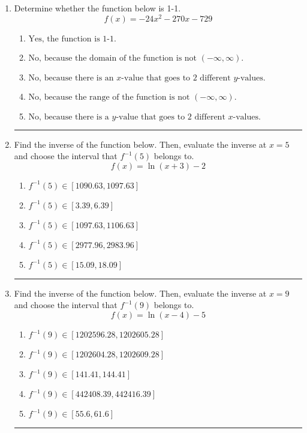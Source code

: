 \documentclass[14pt]{extbook}
\newcommand{\litem}[1]{\item#1\hspace*{-1cm}\rule{\textwidth}{0.4pt}}
\begin{document}
\begin{enumerate}
{\begin{enumerate}[label=\Alph*.]
\end{enumerate} }
\litem{
Determine whether the function below is 1-1.\[ f(x) = -24 x^2 - 270 x - 729 \]\begin{enumerate}[label=\Alph*.]
\item \( \text{Yes, the function is 1-1.} \)
\item \( \text{No, because the domain of the function is not $(-\infty, \infty)$.} \)
\item \( \text{No, because there is an $x$-value that goes to 2 different $y$-values.} \)
\item \( \text{No, because the range of the function is not $(-\infty, \infty)$.} \)
\item \( \text{No, because there is a $y$-value that goes to 2 different $x$-values.} \)

\end{enumerate} }
\litem{
Find the inverse of the function below. Then, evaluate the inverse at $x = 5$ and choose the interval that $f^{-1}(5)$ belongs to.\[ f(x) = \ln{(x+3)}-2 \]\begin{enumerate}[label=\Alph*.]
\item \( f^{-1}(5) \in [1090.63, 1097.63] \)
\item \( f^{-1}(5) \in [3.39, 6.39] \)
\item \( f^{-1}(5) \in [1097.63, 1106.63] \)
\item \( f^{-1}(5) \in [2977.96, 2983.96] \)
\item \( f^{-1}(5) \in [15.09, 18.09] \)

\end{enumerate} }
\litem{
Find the inverse of the function below. Then, evaluate the inverse at $x = 9$ and choose the interval that $f^{-1}(9)$ belongs to.\[ f(x) = \ln{(x-4)}-5 \]\begin{enumerate}[label=\Alph*.]
\item \( f^{-1}(9) \in [1202596.28, 1202605.28] \)
\item \( f^{-1}(9) \in [1202604.28, 1202609.28] \)
\item \( f^{-1}(9) \in [141.41, 144.41] \)
\item \( f^{-1}(9) \in [442408.39, 442416.39] \)
\item \( f^{-1}(9) \in [55.6, 61.6] \)


\end{enumerate}}
\end{enumerate}
\end{document}
